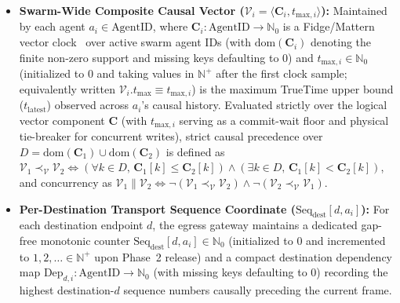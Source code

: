 \documentclass[conference,10pt]{IEEEtran}
\begin{document}
\begin{itemize}
    \item \textbf{Swarm-Wide Composite Causal Vector ($\mathcal{V}_i = \langle \mathbf{C}_i, t_{\text{max},i} \rangle$):} Maintained by each agent $a_i \in \text{AgentID}$, where $\mathbf{C}_i: \text{AgentID} \to \mathbb{N}_0$ is a Fidge/Mattern vector clock~\cite{fidge1988timestamps, mattern1988virtual} over active swarm agent IDs (with $\text{dom}(\mathbf{C}_i)$ denoting the finite non-zero support and missing keys defaulting to $0$) and $t_{\text{max},i} \in \mathbb{N}_0$ (initialized to $0$ and taking values in $\mathbb{N}^+$ after the first clock sample; equivalently written $\mathcal{V}_i.t_{\text{max}} \equiv t_{\text{max},i}$) is the maximum TrueTime upper bound ($t_{\text{latest}}$) observed across $a_i$'s causal history. Evaluated strictly over the logical vector component $\mathbf{C}$ (with $t_{\text{max},i}$ serving as a commit-wait floor and physical tie-breaker for concurrent writes), strict causal precedence over $D = \text{dom}(\mathbf{C}_1) \cup \text{dom}(\mathbf{C}_2)$ is defined as $\mathcal{V}_1 \prec_{\mathcal{V}} \mathcal{V}_2 \iff (\forall k \in D,\, \mathbf{C}_1[k] \le \mathbf{C}_2[k]) \land (\exists k \in D,\, \mathbf{C}_1[k] < \mathbf{C}_2[k])$, and concurrency as $\mathcal{V}_1 \parallel \mathcal{V}_2 \iff \neg(\mathcal{V}_1 \prec_{\mathcal{V}} \mathcal{V}_2) \land \neg(\mathcal{V}_2 \prec_{\mathcal{V}} \mathcal{V}_1)$.
    \item \textbf{Per-Destination Transport Sequence Coordinate ($\text{Seq}_{\text{dest}}[d, a_i]$):} For each destination endpoint $d$, the egress gateway maintains a dedicated gap-free monotonic counter $\text{Seq}_{\text{dest}}[d, a_i] \in \mathbb{N}_0$ (initialized to $0$ and incremented to $1, 2, \dots \in \mathbb{N}^+$ upon Phase~2 release) and a compact destination dependency map $\text{Dep}_{d,i}: \text{AgentID} \to \mathbb{N}_0$ (with missing keys defaulting to $0$) recording the highest destination-$d$ sequence numbers causally preceding the current frame.
\end{itemize}
\end{document}
